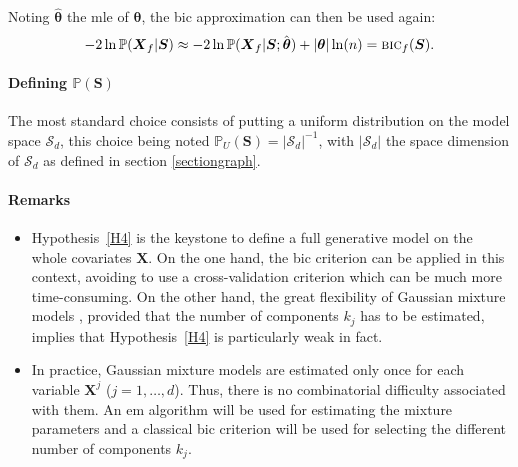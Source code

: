 \documentclass[12pt,a4paper]{report}
\begin{document}
\vspace{3mm}

Noting $\hat{\boldsymbol{\theta}}$ the {\sc mle} of $\boldsymbol{\theta}$, the {\sc bic} approximation can then be used again:
\begin{equation}
-2\ln \mathbb{P}(\boldsymbol{X}_f|\boldsymbol{S}) \approx -2\ln \mathbb{P}(\boldsymbol{X}_f|\boldsymbol{S};\hat{\boldsymbol{\theta}}) + |{\boldsymbol{\theta}}| \ln(n) = \mbox{{\sc bic}}_f(\boldsymbol{S}).
\end{equation}

\paragraph{Defining $\mathbb{P}(\boldsymbol{S})$} The most standard choice consists of putting a uniform distribution on the model space $\mathcal{S}_d$, this choice being noted $\mathbb{P}_U(\boldsymbol{S}) = |\mathcal{S}_d|^{-1}$, with $|\mathcal{S}_d|$ the space dimension of $\mathcal{S}_d$ as defined in section \ref{sectiongraph}.
		
	
\paragraph{Remarks}\begin{itemize}
	\item Hypothesis~\ref{H4} is the keystone to define a full generative model on the whole covariates $\boldsymbol{X}$. On the one hand, the {\sc bic} criterion can be applied in this context, avoiding to use a cross-validation criterion which can be much more time-consuming. On the other hand, the great flexibility  of Gaussian mixture models \cite{mclachlan2004finite}, provided that the number of components $k_j$ has to be estimated, implies that Hypothesis~\ref{H4} is particularly weak in fact.
\item In practice, Gaussian mixture models are estimated only once for each variable $\boldsymbol{X}^j$ ($j=1,\ldots,d$). Thus, there is no combinatorial difficulty associated with them. An {\sc em} algorithm \cite{dempster1977maximum} will be used for estimating the mixture parameters and a classical {\sc bic} criterion \cite{Sch1978} will be used for selecting the different number of components $k_j$.
\end{itemize}	
	
\end{document}
